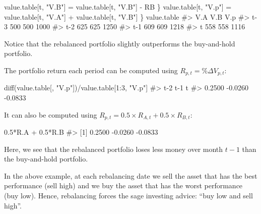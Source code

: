 \documentclass[
  letterpaper,
  DIV=11,
  numbers=noendperiod]{scrreprt}
\newenvironment{Shaded}{\begin{snugshade}}{\end{snugshade}}
\newcommand{\CommentTok}[1]{\textcolor[rgb]{0.37,0.37,0.37}{#1}}
\newcommand{\DecValTok}[1]{\textcolor[rgb]{0.68,0.00,0.00}{#1}}
\newcommand{\FloatTok}[1]{\textcolor[rgb]{0.68,0.00,0.00}{#1}}
\newcommand{\FunctionTok}[1]{\textcolor[rgb]{0.28,0.35,0.67}{#1}}
\newcommand{\NormalTok}[1]{\textcolor[rgb]{0.00,0.23,0.31}{#1}}
\newcommand{\OtherTok}[1]{\textcolor[rgb]{0.00,0.23,0.31}{#1}}
\newcommand{\SpecialCharTok}[1]{\textcolor[rgb]{0.37,0.37,0.37}{#1}}
\newcommand{\StringTok}[1]{\textcolor[rgb]{0.13,0.47,0.30}{#1}}
\theoremstyle{definition}
\theoremstyle{definition}
\theoremstyle{remark}
\begin{document}
\begin{Shaded}
\begin{Highlighting}[]
\NormalTok{    value.table[t, }\StringTok{"V.B"}\NormalTok{] }\OtherTok{=}\NormalTok{ value.table[t, }\StringTok{"V.B"}\NormalTok{] }\SpecialCharTok{{-}}\NormalTok{ RB}
\NormalTok{  \}}
\NormalTok{  value.table[t, }\StringTok{"V.p"}\NormalTok{] }\OtherTok{=}\NormalTok{ value.table[t, }\StringTok{"V.A"}\NormalTok{] }\SpecialCharTok{+}\NormalTok{ value.table[t, }\StringTok{"V.B"}\NormalTok{]}
\NormalTok{\}}
\NormalTok{value.table}
\CommentTok{\#\textgreater{}     V.A V.B  V.p}
\CommentTok{\#\textgreater{} t{-}3 500 500 1000}
\CommentTok{\#\textgreater{} t{-}2 625 625 1250}
\CommentTok{\#\textgreater{} t{-}1 609 609 1218}
\CommentTok{\#\textgreater{} t   558 558 1116}
\end{Highlighting}
\end{Shaded}

Notice that the rebalanced portfolio slightly outperforms the
buy-and-hold portfolio.

The portfolio return each period can be computed using
\(R_{p,t} = \%\Delta V_{p,t}\):

\begin{Shaded}
\begin{Highlighting}[]
\FunctionTok{diff}\NormalTok{(value.table[, }\StringTok{"V.p"}\NormalTok{])}\SpecialCharTok{/}\NormalTok{value.table[}\DecValTok{1}\SpecialCharTok{:}\DecValTok{3}\NormalTok{, }\StringTok{"V.p"}\NormalTok{]}
\CommentTok{\#\textgreater{}     t{-}2     t{-}1       t }
\CommentTok{\#\textgreater{}  0.2500 {-}0.0260 {-}0.0833}
\end{Highlighting}
\end{Shaded}

It can also be computed using
\(R_{p,t} = 0.5\times R_{A,t} + 0.5\times R_{B,t}\):

\begin{Shaded}
\begin{Highlighting}[]
\FloatTok{0.5}\SpecialCharTok{*}\NormalTok{R.A }\SpecialCharTok{+} \FloatTok{0.5}\SpecialCharTok{*}\NormalTok{R.B}
\CommentTok{\#\textgreater{} [1]  0.2500 {-}0.0260 {-}0.0833}
\end{Highlighting}
\end{Shaded}

Here, we see that the rebalanced portfolio loses less money over month
\(t-1\) than the buy-and-hold portfolio.

In the above example, at each rebalancing date we sell the asset that
has the best performance (sell high) and we buy the asset that has the
worst performance (buy low). Hence, rebalancing forces the sage
investing advice: ``buy low and sell high''.
\end{document}
